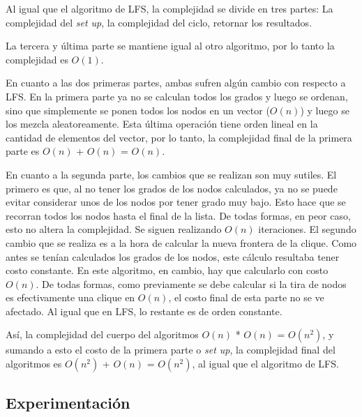 Al igual que el algoritmo de LFS, la complejidad se divide en tres partes: La complejidad del \textit{set up}, la complejidad del ciclo, retornar los resultados.

La tercera y última parte se mantiene igual al otro algoritmo, por lo tanto la complejidad es $O(1)$.

En cuanto a las dos primeras partes, ambas sufren algún cambio con respecto a LFS. En la primera parte ya no se calculan todos los grados y luego se ordenan, sino que simplemente se ponen todos los nodos en un vector ($O(n)$) y luego se los mezcla aleatoreamente. Esta última operación tiene orden lineal en la cantidad de elementos del vector, por lo tanto, la complejidad final de la primera parte es $O(n)$ + $O(n)$ = $O(n)$.

En cuanto a la segunda parte, los cambios que se realizan son muy sutiles. El primero es que, al no tener los grados de los nodos calculados, ya no se puede evitar considerar unos de los nodos por tener grado muy bajo. Esto hace que se recorran todos los nodos hasta el final de la lista. De todas formas, en peor caso, esto no altera la complejidad. Se siguen realizando $O(n)$ iteraciones. El segundo cambio que se realiza es a la hora de calcular la nueva frontera de la clique. Como antes se tenían calculados los grados de los nodos, este cálculo resultaba tener costo constante. En este algoritmo, en cambio, hay que calcularlo con costo $O(n)$. De todas formas, como previamente se debe calcular si la tira de nodos es efectivamente una clique en $O(n)$, el costo final de esta parte no se ve afectado. Al igual que en LFS, lo restante es de orden constante. 

 Así, la complejidad del cuerpo del algoritmos $O(n)$ * $O(n)$ = $O(n^2)$, y sumando a esto el costo de la primera parte o \textit{set up}, la complejidad final del algoritmos es $O(n^2)$ + $O(n)$ = $O(n^2)$, al igual que el algoritmo de LFS.

\subsection{Experimentación}